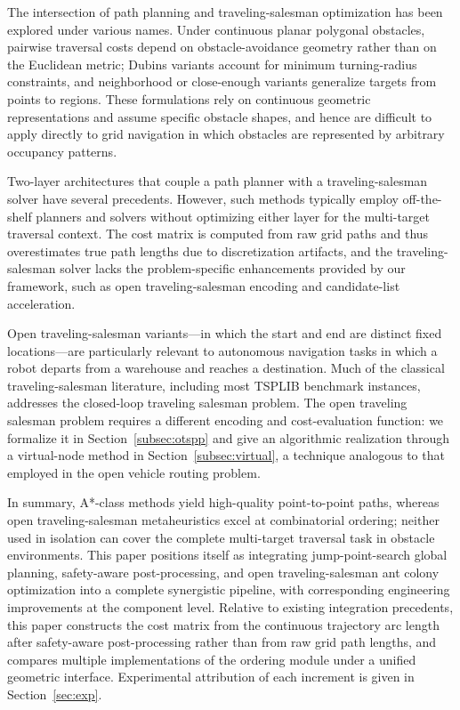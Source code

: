 The intersection of path planning and traveling-salesman optimization has been explored under various names\textcolor{blue}{\cite{ref4,ref36}}. Under continuous planar polygonal obstacles, pairwise traversal costs depend on obstacle-avoidance geometry rather than on the Euclidean metric\textcolor{blue}{\cite{ref39}}; Dubins variants account for minimum turning-radius constraints, and neighborhood or close-enough variants generalize targets from points to regions\textcolor{blue}{\cite{ref40}}. These formulations rely on continuous geometric representations and assume specific obstacle shapes, and hence are difficult to apply directly to grid navigation in which obstacles are represented by arbitrary occupancy patterns.

Two-layer architectures that couple a path planner with a traveling-salesman solver have several precedents\textcolor{blue}{\cite{ref1,ref2}}. However, such methods typically employ off-the-shelf planners and solvers without optimizing either layer for the multi-target traversal context. The cost matrix is computed from raw grid paths and thus overestimates true path lengths due to discretization artifacts, and the traveling-salesman solver lacks the problem-specific enhancements provided by our framework, such as open traveling-salesman encoding and candidate-list acceleration.

Open traveling-salesman variants---in which the start and end are distinct fixed locations---are particularly relevant to autonomous navigation tasks in which a robot departs from a warehouse and reaches a destination. Much of the classical traveling-salesman literature, including most TSPLIB benchmark instances, addresses the closed-loop traveling salesman problem. The open traveling salesman problem requires a different encoding and cost-evaluation function: we formalize it in Section~\textcolor{blue}{\ref{subsec:otspp}} and give an algorithmic realization through a virtual-node method in Section~\textcolor{blue}{\ref{subsec:virtual}}, a technique analogous to that employed in the open vehicle routing problem\textcolor{blue}{\cite{ref32}}.

In summary, A*-class methods yield high-quality point-to-point paths, whereas open traveling-salesman metaheuristics excel at combinatorial ordering; neither used in isolation can cover the complete multi-target traversal task in obstacle environments. This paper positions itself as integrating jump-point-search global planning, safety-aware post-processing, and open traveling-salesman ant colony optimization into a complete synergistic pipeline, with corresponding engineering improvements at the component level. Relative to existing integration precedents\textcolor{blue}{\cite{ref1,ref2}}, this paper constructs the cost matrix from the continuous trajectory arc length after safety-aware post-processing rather than from raw grid path lengths, and compares multiple implementations of the ordering module under a unified geometric interface. Experimental attribution of each increment is given in Section~\textcolor{blue}{\ref{sec:exp}}.

